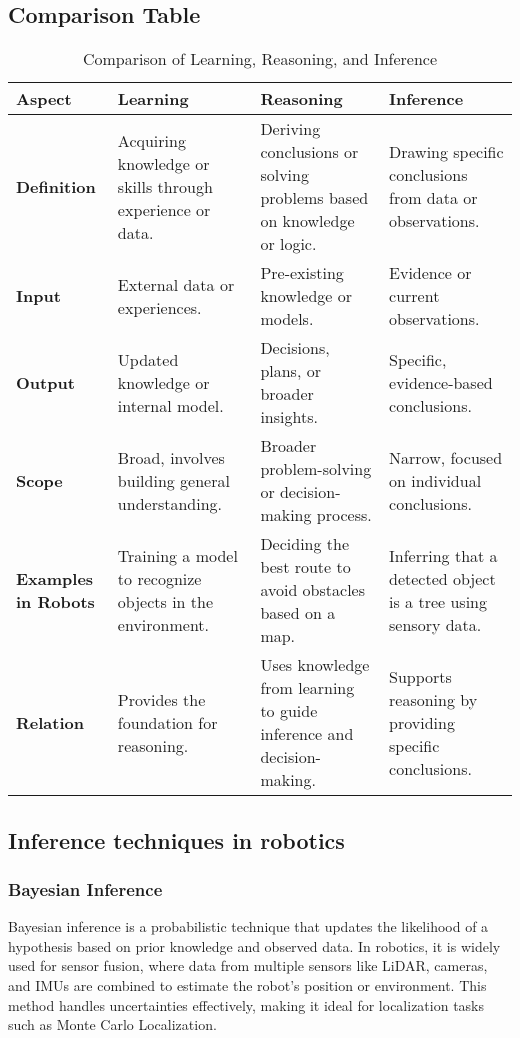 \subsection{Comparison Table}
\begin{table}[h!]
    \centering
    \begin{tabular}{|l|l|l|l|}
        \hline
        \textbf{Aspect} & \textbf{Learning} & \textbf{Reasoning} & \textbf{Inference} \\ \hline
        \textbf{Definition} & Acquiring knowledge or skills through experience or data. & Deriving conclusions or solving problems based on knowledge or logic. & Drawing specific conclusions from data or observations. \\ \hline
        \textbf{Input} & External data or experiences. & Pre-existing knowledge or models. & Evidence or current observations. \\ \hline
        \textbf{Output} & Updated knowledge or internal model. & Decisions, plans, or broader insights. & Specific, evidence-based conclusions. \\ \hline
        \textbf{Scope} & Broad, involves building general understanding. & Broader problem-solving or decision-making process. & Narrow, focused on individual conclusions. \\ \hline
        \textbf{Examples in Robots} & Training a model to recognize objects in the environment. & Deciding the best route to avoid obstacles based on a map. & Inferring that a detected object is a tree using sensory data. \\ \hline
        \textbf{Relation} & Provides the foundation for reasoning. & Uses knowledge from learning to guide inference and decision-making. & Supports reasoning by providing specific conclusions. \\ \hline
    \end{tabular}
    \caption{Comparison of Learning, Reasoning, and Inference}
\end{table}
\subsection{Inference techniques in robotics}

    \subsubsection{Bayesian Inference}
    Bayesian inference is a probabilistic technique that updates the likelihood of a hypothesis based on prior knowledge and observed data. In robotics, it is widely used for sensor fusion, where data from multiple sensors like LiDAR, cameras, and IMUs are combined to estimate the robot's position or environment. This method handles uncertainties effectively, making it ideal for localization tasks such as Monte Carlo Localization. \cite{bishop-2006-pattern-recognition}
    
